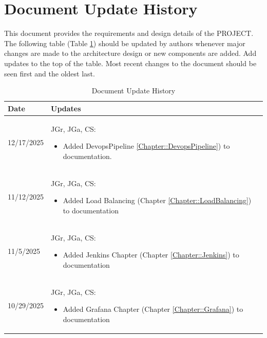 \section{Document Update History}

This document provides the requirements and design details of the
PROJECT.  The following table (Table \ref{Table::UpdateHistory}) should be
updated by authors whenever major changes are made to the architecture
design or new components are added. Add updates to the top of the table.  
Most recent changes to the document should be seen first and the oldest 
last.

\begin{longtable}{|l||p{12.5cm}|}
\caption{Document Update History \label{Table::UpdateHistory}}\\
\hline
\textbf{Date} & \textbf{Updates} \\
\hline 
\endhead

12/17/2025 & JGr, JGa, CS:
\begin{itemize}[topsep=0pt,itemsep=0pt,parsep=0pt,partopsep=0pt,leftmargin=12pt]
\item Added DevopsPipeline \ref{Chapter::DevopsPipeline}) to documentation.
\end{itemize} 
\\ \hline

11/12/2025 & JGr, JGa, CS:
\begin{itemize}[topsep=0pt,itemsep=0pt,parsep=0pt,partopsep=0pt,leftmargin=12pt]
\item Added Load Balancing (Chapter \ref{Chapter::LoadBalancing}) to documentation
\end{itemize} 
\\ \hline

11/5/2025 & JGr, JGa, CS:
\begin{itemize}[topsep=0pt,itemsep=0pt,parsep=0pt,partopsep=0pt,leftmargin=12pt]
\item Added Jenkins Chapter (Chapter \ref{Chapter::Jenkins}) to documentation
\end{itemize} 
\\ \hline


10/29/2025 & JGr, JGa, CS:
\begin{itemize}[topsep=0pt,itemsep=0pt,parsep=0pt,partopsep=0pt,leftmargin=12pt]
\item Added Grafana Chapter (Chapter \ref{Chapter::Grafana}) to documentation
\end{itemize} 
\\ \hline


\end{longtable}
